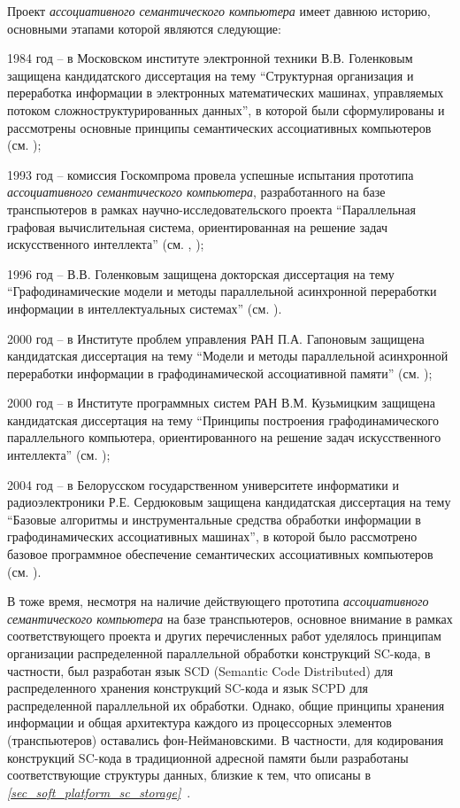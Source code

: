 Проект \textit{ассоциативного семантического компьютера} имеет давнюю историю, основными этапами которой являются следующие:
\begin{textitemize}
\item 1984 год -- в Московском  институте электронной техники В.В. Голенковым защищена кандидатского диссертация на тему ``Структурная организация и переработка информации в электронных математических машинах, управляемых потоком сложноструктурированных данных'', в которой были сформулированы и рассмотрены основные принципы семантических ассоциативных компьютеров (см. );
\item 1993 год -- комиссия Госкомпрома провела успешные испытания прототипа \textit{ассоциативного семантического компьютера}, разработанного на базе транспьютеров в рамках научно-исследовательского проекта ``Параллельная графовая вычислительная система, ориентированная на решение задач искусственного интеллекта'' (см. , );
\item 1996 год -- В.В. Голенковым защищена докторская диссертация на тему ``Графодинамические модели и методы параллельной асинхронной переработки информации в интеллектуальных системах'' (см. ). 
\item 2000 год -- в Институте проблем управления РАН П.А. Гапоновым защищена кандидатская диссертация на тему ``Модели и методы параллельной асинхронной переработки информации в графодинамической ассоциативной памяти'' (см. );
\item 2000 год -- в Институте программных систем РАН В.М. Кузьмицким защищена кандидатская диссертация на тему ``Принципы построения графодинамического параллельного компьютера, ориентированного на решение задач искусственного интеллекта'' (см. );
\item 2004 год -- в Белорусском государственном университете информатики и радиоэлектроники Р.Е. Сердюковым защищена кандидатская диссертация на тему ``Базовые алгоритмы и инструментальные средства обработки информации в графодинамических ассоциативных машинах'', в которой было рассмотрено базовое программное обеспечение семантических ассоциативных компьютеров (см. ).
\end{textitemize}

В тоже время, несмотря на наличие действующего прототипа \textit{ассоциативного семантического компьютера} на базе транспьютеров, основное внимание в рамках соответствующего проекта и других перечисленных работ уделялось принципам организации распределенной параллельной обработки конструкций SC-кода, в частности, был разработан язык SCD (Semantic Code Distributed) для распределенного хранения конструкций SC-кода и язык SCPD для распределенной параллельной их обработки. Однако, общие принципы хранения информации и общая архитектура каждого из процессорных элементов (транспьютеров) оставались фон-Неймановскими. В частности, для кодирования конструкций SC-кода в традиционной адресной памяти были разработаны соответствующие структуры данных, близкие к тем, что описаны в \textit{\ref{sec_soft_platform_sc_storage}~}.

